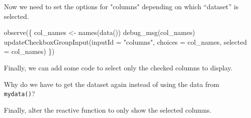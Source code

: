 \documentclass[
  oneside]{book}
\newenvironment{Shaded}{\begin{snugshade}}{\end{snugshade}}
\newcommand{\AttributeTok}[1]{\textcolor[rgb]{0.77,0.63,0.00}{#1}}
\newcommand{\ConstantTok}[1]{\textcolor[rgb]{0.00,0.00,0.00}{#1}}
\newcommand{\FunctionTok}[1]{\textcolor[rgb]{0.00,0.00,0.00}{#1}}
\newcommand{\NormalTok}[1]{#1}
\newcommand{\OtherTok}[1]{\textcolor[rgb]{0.56,0.35,0.01}{#1}}
\newcommand{\SpecialCharTok}[1]{\textcolor[rgb]{0.00,0.00,0.00}{#1}}
\newcommand{\StringTok}[1]{\textcolor[rgb]{0.31,0.60,0.02}{#1}}
\begin{document}
Now we need to set the options for \StringTok{"columns"} depending on which ``dataset'' is selected.

\begin{Shaded}
\begin{Highlighting}[]
\FunctionTok{observe}\NormalTok{(\{}
\NormalTok{  col\_names }\OtherTok{\textless{}{-}} \FunctionTok{names}\NormalTok{(}\FunctionTok{data}\NormalTok{())}
  \FunctionTok{debug\_msg}\NormalTok{(col\_names)}
  \FunctionTok{updateCheckboxGroupInput}\NormalTok{(}\AttributeTok{inputId =} \StringTok{"columns"}\NormalTok{,}
                           \AttributeTok{choices =}\NormalTok{ col\_names,}
                           \AttributeTok{selected =}\NormalTok{ col\_names)}
\NormalTok{\})}
\end{Highlighting}
\end{Shaded}

Finally, we can add some code to select only the checked columns to display.

\begin{Shaded}
\end{Shaded}

\begin{try}
Why do we have to get the dataset again instead of using the data from \texttt{mydata}\texttt{()}?

\end{try}

Finally, alter the reactive function to only show the selected columns.

\begin{Shaded}
\end{Shaded}
\end{document}
